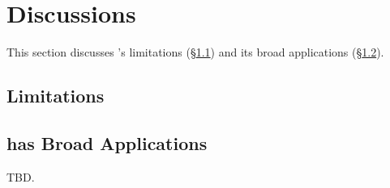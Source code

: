 \section{Discussions}\label{sec:discuss}

This section discusses \xxx's limitations (\S\ref{sec:limits}) and its broad 
applications (\S\ref{sec:apps}).

\subsection{Limitations}\label{sec:limits}





\subsection{\xxx has Broad Applications}\label{sec:apps}

TBD.
